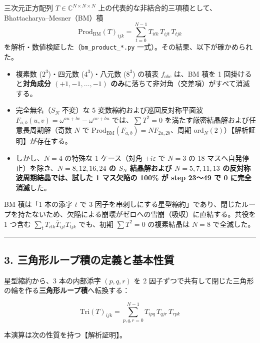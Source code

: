 \documentclass[
  a4paper,
]{ltjsarticle}
\providecommand{\tightlist}{%
  \setlength{\itemsep}{0pt}\setlength{\parskip}{0pt}}
\begin{document}
三次元正方配列 \(T \in \mathbb{C}^{N \times N \times N}\)
上の代表的な非結合的三項積として、Bhattacharya--Mesner（BM）積
\[\mathrm{Prod}_{\mathrm{BM}}(T)_{ijk} = \sum_{t=0}^{N-1} T_{itk}\, T_{ijt}\, T_{tjk}\]
を解析・数値検証した（\texttt{bm\_\allowbreak{}product\_\allowbreak{}*.py}
一式）。その結果、以下が確かめられた。

\begin{itemize}
\tightlist
\item
  複素数 (\(2^3\))・四元数 (\(4^3\))・八元数 (\(8^3\)) の積表
  \(f_{abc}\) は、BM 積を 1 回掛けると\textbf{対角成分
  \((+1, -1, \dots, -1)\)
  のみ}に落ちて非対角（交差項）がすべて消滅する。
\item
  完全無名（\(S_N\) 不変）な 5 変数縮約および巡回反対称平面波
  \(F_{a,b}(u,v) = \omega^{au+bv} - \omega^{av+bu}\)
  では、\(\sum T^2 = 0\) を満たす厳密結晶解および任意長周期解（奇数
  \(N\) で \(\mathrm{Prod}_{\mathrm{BM}}(F_{a,b}) = N F_{2a,2b}\)、周期
  \(\mathrm{ord}_N(2)\)）【解析証明】が存在する。
\item
  しかし、\(N = 4\) の特殊な 1 ケース（対角 \(+i\varepsilon\) で \(N=3\)
  の 18 マスへ自発停止）を除き、\textbf{\(N = 8, 12, 16, 24\) の \(S_N\)
  結晶解および \(N = 5, 7, 11, 13\) の反対称波周期結晶では、試した 1
  マス欠陥の 100\% が step 23〜49 で 0 に完全消滅}した。
\end{itemize}

BM 積は「1 本の添字 \(t\) で 3
因子を串刺しにする星型縮約」であり、閉じたループを持たないため、欠陥による崩壊がゼロへの雪崩（吸収）に直結する。共役を
1 つ含む \(\sum_t T_{itk} \overline{T}_{ijt} T_{tjk}\) でも、初期
\(\sum T^2 = 0\) の複素結晶は \(N = 8\) で全滅した。

\begin{center}\rule{0.5\linewidth}{0.5pt}\end{center}

\subsection{3.
三角形ループ積の定義と基本性質}\label{ux4e09ux89d2ux5f62ux30ebux30fcux30d7ux7a4dux306eux5b9aux7fa9ux3068ux57faux672cux6027ux8cea}

星型縮約から、3 本の内部添字 \((p, q, r)\) を 2
因子ずつで共有して閉じた三角形の輪を作る\textbf{三角形ループ積}へ転換する：

\[\mathrm{Tri}(T)_{ijk} = \sum_{p,q,r=0}^{N-1} T_{ipq}\, T_{qjr}\, T_{rpk} \tag{1}\]

本演算は次の性質を持つ【解析証明】。
\end{document}
